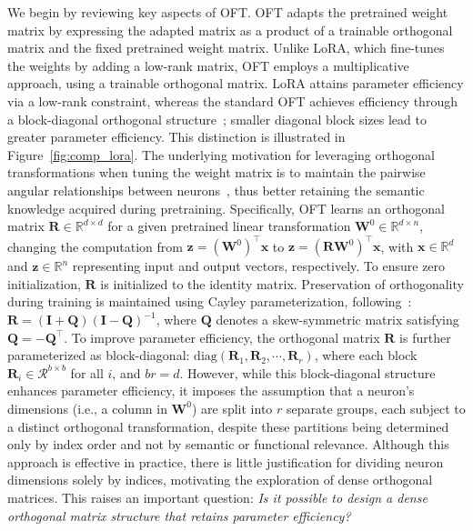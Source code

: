 We begin by reviewing key aspects of OFT. OFT adapts the pretrained weight matrix by expressing the adapted matrix as a product of a trainable orthogonal matrix and the fixed pretrained weight matrix. Unlike LoRA, which fine-tunes the weights by adding a low-rank matrix, OFT employs a multiplicative approach, using a trainable orthogonal matrix. LoRA attains parameter efficiency via a low-rank constraint, whereas the standard OFT achieves efficiency through a block-diagonal orthogonal structure~\cite{qiu2023controlling}; smaller diagonal block sizes lead to greater parameter efficiency. This distinction is illustrated in Figure~\ref{fig:comp_lora}. The underlying motivation for leveraging orthogonal transformations when tuning the weight matrix is to maintain the pairwise angular relationships between neurons~\cite{liu2018learning,liu2021orthogonal,qiu2023controlling}, thus better retaining the semantic knowledge acquired during pretraining. Specifically, OFT learns an orthogonal matrix $\bm{R}\in\mathbb{R}^{d\times d}$ for a given pretrained linear transformation $\bm{W}^0\in\mathbb{R}^{d\times n}$, changing the computation from $\bm{z}=(\bm{W}^0)^\top\bm{x}$ to $\bm{z}=(\bm{R}\bm{W}^0)^\top\bm{x}$, with $\bm{x}\in\mathbb{R}^{d}$ and $\bm{z}\in\mathbb{R}^{n}$ representing input and output vectors, respectively. To ensure zero initialization, $\bm{R}$ is initialized to the identity matrix. Preservation of orthogonality during training is maintained using Cayley parameterization, following~\cite{qiu2023controlling,liu2021orthogonal}: $\bm{R}=(\bm{I}+\bm{Q})(\bm{I}-\bm{Q})^{-1}$, where $\bm{Q}$ denotes a skew-symmetric matrix satisfying $\bm{Q}=-\bm{Q}^\top$. To improve parameter efficiency, the orthogonal matrix $\bm{R}$ is further parameterized as block-diagonal: $\text{diag}(\bm{R}_1,\bm{R}_2,\cdots,\bm{R}_r)$, where each block $\bm{R}_i\in\mathcal{R}^{b\times b}$ for all $i$, and $br=d$. However, while this block-diagonal structure enhances parameter efficiency, it imposes the assumption that a neuron's dimensions (i.e., a column in $\bm{W}^0$) are split into $r$ separate groups, each subject to a distinct orthogonal transformation, despite these partitions being determined only by index order and not by semantic or functional relevance. Although this approach is effective in practice, there is little justification for dividing neuron dimensions solely by indices, motivating the exploration of dense orthogonal matrices. This raises an important question: \emph{Is it possible to design a dense orthogonal matrix structure that retains parameter efficiency?}


